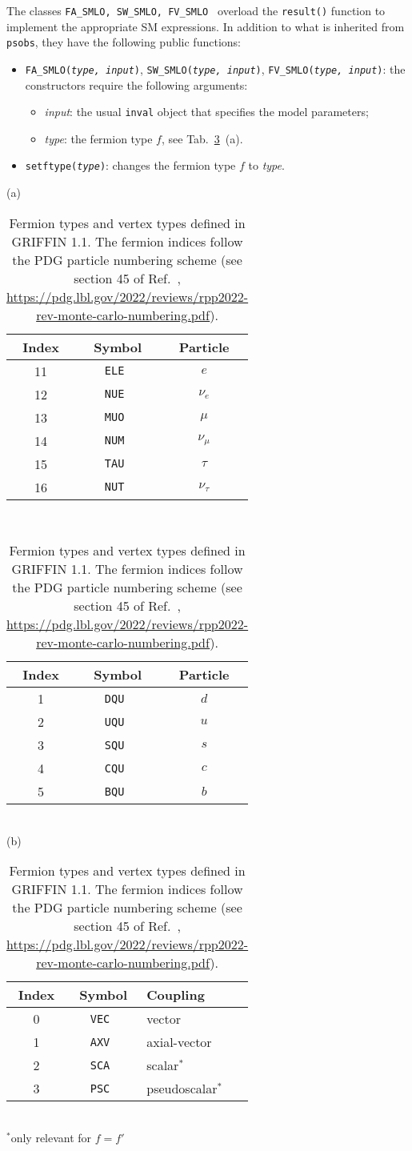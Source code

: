 \documentclass[12pt]{article}
\begin{document}
The classes \texttt{FA\_SMLO, SW\_SMLO, FV\_SMLO } overload the \texttt{result()} function to implement the appropriate SM expressions. In addition to what is inherited from {\tt psobs}, they have the following public functions:
\begin{itemize}
    \item \texttt{FA\_SMLO({\rm\it type, input})}, \texttt{SW\_SMLO({\rm\it type, input})}, \texttt{FV\_SMLO({\rm\it type, input})}: the constructors require the following arguments:
     \begin{itemize}
       \item[] {\it input}: the usual \texttt{inval} object that specifies the model parameters;
       \item[] {\it type}: the fermion type $f$, see Tab.~\ref{tab:ftype}~(a).
     \end{itemize}
    \item \texttt{setftype({\rm\it type})}: changes the fermion type $f$ to {\it type}.
\end{itemize}

\begin{table}[t]
\renewcommand{\arraystretch}{1.1}
\centering
(a)
\begin{tabular}[t]{c|c|c}
\hline
Index & Symbol & Particle \\
\hline
11 & \tt ELE & $e$ \\
12 & \tt NUE & $\nu_e$ \\
13 & \tt MUO & $\mu$ \\
14 & \tt NUM & $\nu_\mu$ \\
15 & \tt TAU & $\tau$ \\
16 & \tt NUT & $\nu_\tau$ \\
\hline
\end{tabular}
\ 
\begin{tabular}[t]{c|c|c}
\hline
Index & Symbol & Particle \\
\hline
1 & \tt DQU & $d$ \\
2 & \tt UQU & $u$ \\
3 & \tt SQU & $s$ \\
4 & \tt CQU & $c$ \\
5 & \tt BQU & $b$ \\
\hline
\end{tabular}
\\[1em]
(b)
\begin{tabular}[t]{c|c|l}
\hline
Index & Symbol & Coupling \\
\hline
0 & \tt VEC & vector \\
1 & \tt AXV & axial-vector \\
2 & \tt SCA & scalar$^*$ \\
3 & \tt PSC & pseudoscalar$^*$ \\
\hline
\end{tabular}\\[.5ex]
$^*${\small only relevant for $f{=}f'$}
\caption{Fermion types and vertex types defined in {\sc GRIFFIN 1.1}. The fermion indices follow the PDG particle numbering scheme (see section 45 of Ref.~\cite{Workman:2022ynf}, \protect\url{https://pdg.lbl.gov/2022/reviews/rpp2022-rev-monte-carlo-numbering.pdf}).}
\label{tab:ftype}
\end{table}
\end{document}
